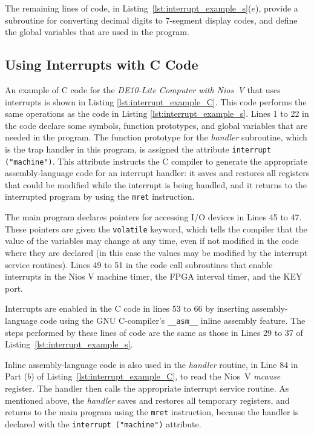 \documentclass[11pt, twoside, pdftex]{article}
\newcommand{\systemNameFull}{DE10-Lite Computer with Nios~V}
\begin{document}
The remaining lines of code, in Listing~\ref{lst:interrupt_example_s}($e$),
provide a subroutine for converting decimal digits to 7-segment display codes,
and define the global variables that are used in the program.

\subsection{Using Interrupts with C Code}

An example of C code for the {\it \systemNameFull} that uses interrupts is shown in 
Listing \ref{lst:interrupt_example_C}. This code performs the same operations as
the code in Listing \ref{lst:interrupt_example_s}. Lines 1 to 22 in the code declare some symbols, 
function prototypes, and global variables that are needed in the program. The function
prototype for the {\it handler} subroutine, which is the trap handler in this program, is
assigned the attribute \texttt{interrupt ("machine")}. This attribute instructs the C compiler 
to generate the appropriate assembly-language code for an interrupt handler: it saves and 
restores all registers that could be modified while the interrupt is being handled, and it 
returns to the interrupted program by using the \texttt{mret} instruction. 

The main program declares pointers for accessing I/O devices in Lines 45 to 47. These
pointers are given the \texttt{volatile} keyword, which tells the compiler that the
value of the variables may change at any time, even if not modified in the code where
they are declared (in this case the values may be modified by the interrupt service routines). 
Lines 49 to 51 in the code call subroutines that enable interrupts in the Nios V machine
timer, the FPGA interval timer, and the KEY port. 

Interrupts are enabled in the C code in lines 53 to 66 by inserting assembly-language code 
using the GNU C-compiler's \texttt{\_\_asm\_\_} inline assembly feature. The steps performed by
these lines of code are the same as those in Lines 29 to 37 of 
Listing~\ref{lst:interrupt_example_s}.

Inline assembly-language code is also used in the {\it handler} routine, in Line 84 in 
Part ($b$) of Listing~\ref{lst:interrupt_example_C}, to read the Nios~V {\it mcause} register.
The handler then calls the appropriate interrupt service routine. As mentioned above, the
{\it handler} saves and restores all temporary registers, and returns to the main program 
using the \texttt{mret} instruction, because the
handler is declared with the \texttt{interrupt ("machine")} attribute.
\end{document}
